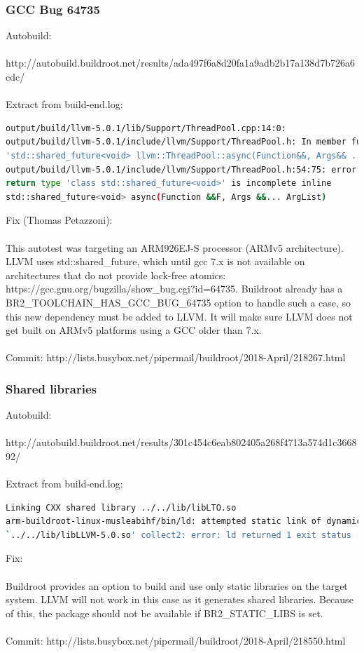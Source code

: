 \documentclass[12pt,a4paper,oneside]{article}
\begin{document}
\subsubsection*{GCC Bug 64735}
Autobuild:\\\\
http://autobuild.buildroot.net/results/ada497f6a8d20fa1a9adb2b17a138d7b726a6cdc/\\\\
Extract from build-end.log:
\begin{lstlisting}[language=sh,keywords={}]
output/build/llvm-5.0.1/lib/Support/ThreadPool.cpp:14:0:
output/build/llvm-5.0.1/include/llvm/Support/ThreadPool.h: In member function
'std::shared_future<void> llvm::ThreadPool::async(Function&&, Args&& ...)':
output/build/llvm-5.0.1/include/llvm/Support/ThreadPool.h:54:75: error:
return type 'class std::shared_future<void>' is incomplete inline
std::shared_future<void> async(Function &&F, Args &&... ArgList)
\end{lstlisting}
Fix (Thomas Petazzoni):\\\\
This autotest was targeting an ARM926EJ-S processor (ARMv5 architecture). LLVM
uses std::shared\_future, which until gcc 7.x is not available on architectures
that do not provide lock-free atomics: https://gcc.gnu.org/bugzilla/show\_bug.cgi?id=64735.
Buildroot already has a BR2\_TOOLCHAIN\_HAS\_GCC\_BUG\_64735 option to handle such a
case, so this new dependency must be added to LLVM. It will make sure LLVM does
not get built on ARMv5 platforms using a GCC older than 7.x.\\\\
Commit: http://lists.busybox.net/pipermail/buildroot/2018-April/218267.html

\subsubsection*{Shared libraries}
Autobuild:\\\\
http://autobuild.buildroot.net/results/301c454c6eab802405a268f4713a574d1c366892/\\\\
Extract from build-end.log:
\begin{lstlisting}[language=sh,keywords={}]
Linking CXX shared library ../../lib/libLTO.so
arm-buildroot-linux-musleabihf/bin/ld: attempted static link of dynamic object
`../../lib/libLLVM-5.0.so' collect2: error: ld returned 1 exit status
\end{lstlisting}
Fix:\\\\
Buildroot provides an option to build and use only static libraries on the target
system. LLVM will not work in this case as it generates shared libraries. Because
of this, the package should not be available if BR2\_STATIC\_LIBS is set.\\\\
Commit: http://lists.busybox.net/pipermail/buildroot/2018-April/218550.html
\end{document}
